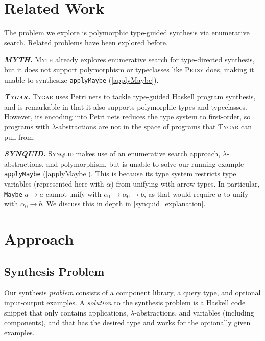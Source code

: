 \documentclass[acmsmall,nonacm]{acmart}
\begin{document}
\section{Related Work}

The problem we explore is polymorphic type-guided synthesis via 
enumerative search. Related problems have been explored before. 

\vspace{2mm}
\noindent \textbf{\textit{MYTH.}} \textsc{Myth} \cite{myth}
already explores enumerative search for 
type-directed synthesis, but it does not support polymorphism or typeclasses 
like \textsc{Petsy} does, making it unable to synthesize \texttt{applyMaybe} (\ref{applyMaybe}).

\vspace{2mm}
\noindent \textbf{\textit{\textsc{Tygar}.}} \textsc{Tygar} \cite{tygar} uses Petri nets to 
tackle type-guided Haskell program synthesis, and is remarkable in that 
it also supports polymorphic types and typeclasses.
However, its encoding into Petri nets 
reduces the type system to first-order, so programs with $\lambda$-abstractions are not in the
space of programs that \textsc{Tygar} can pull from.

\vspace{2mm}
\noindent \textbf{\textit{SYNQUID.}} \textsc{Synquid} \cite{synquid} makes 
use of an enumerative search approach, $\lambda$-abstractions, and polymorphism, but 
is unable to solve our running example \texttt{applyMaybe} (\ref{applyMaybe}).
This is because its type system restricts type variables (represented here with $\alpha$)
from unifying with arrow types. In particular,
\texttt{Maybe} ${a \to a}$ cannot unify with
${\alpha_1 \to \alpha_0 \to b}$, 
as that would require $a$ to unify with $\alpha_0 \to b$. We discuss this in depth 
in \ref{synquid_explanation}.



\section{Approach}
\label{approach}



\subsection{Synthesis Problem}

Our synthesis \textit{problem} consists of a component library, a query type,
and optional input-output examples. A \textit{solution} to the synthesis 
problem is a Haskell code snippet that only contains applications, 
$\lambda$-abstractions, and variables (including components), and
that has the desired type and works 
for the optionally given examples.
\end{document}
